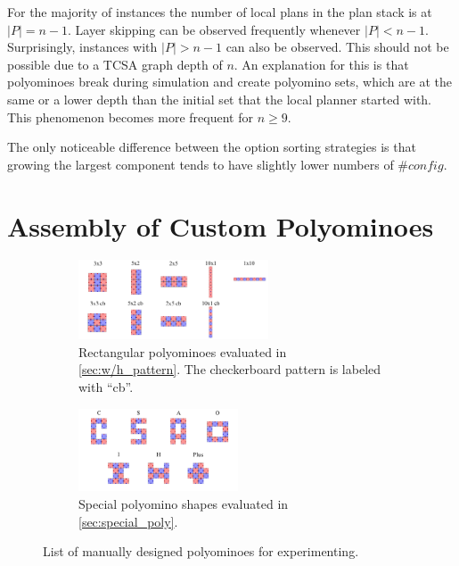 For the majority of instances the number of local plans in the plan stack is at $|P| = n-1$.
Layer skipping can be observed frequently whenever $|P| < n-1$.
Surprisingly, instances with $|P| > n-1$ can also be observed.
This should not be possible due to a TCSA graph depth of $n$.
An explanation for this is that polyominoes break during simulation and create polyomino sets, which are at the same or a lower depth than the initial set that the local planner started with.
This phenomenon becomes more frequent for $n \geq 9$.

The only noticeable difference between the option sorting strategies is that growing the largest component tends to have slightly lower numbers of $\#\textit{config}$.


\section{Assembly of Custom Polyominoes}
\label{sec:AFTS}

\begin{figure}
	\centering
	\begin{subfigure}[b]{\textwidth}
		\centering
		\includegraphics[width=0.62\textwidth]{figures/AFTS_cb_shapes.pdf}
		\caption{Rectangular polyominoes evaluated in \autoref{sec:w/h_pattern}. The checkerboard pattern is labeled with ``cb''. \hfill}
		\label{fig:AFTS_cb_shapes}
	\end{subfigure}
	\begin{subfigure}[b]{\textwidth}
		\centering
		\includegraphics[width=0.52\textwidth]{figures/AFTS_sp_shapes.pdf}
		\caption{Special polyomino shapes evaluated in \autoref{sec:special_poly}.}
		\label{fig:AFTS_sp_shapes}
	\end{subfigure}
	\caption[List of manually designed polyominoes for experimenting]{List of manually designed polyominoes for experimenting.}
	\label{fig:AFTS_shapes}
\end{figure}

